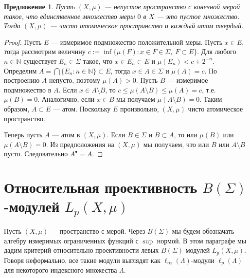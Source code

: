 \documentclass[12pt]{article}
\newtheorem{proposition}[theorem]{Предложение}
\begin{document}
\begin{proposition}\label{GenniunelyAtomicMeasCharac} Пусть $(X,\mu)$ ---
    непустое пространство с конечной мерой такое, что единственное множество
    меры $0$ в $X$ --- это пустое множество. Тогда $(X,\mu)$ --- чисто
    атомическое пространство и каждый атом твердый.
\end{proposition}
\begin{proof} Пусть $E$ --- измеримое подмножество положительной меры. Пусть
    $x\in E$, тогда рассмотрим величину $c:=\inf \{\mu(F):x\in F\in \Sigma,\;
        F\subset E\}$. Для любого $n\in\mathbb{N}$ существует $E_n\in\Sigma$ такое,
    что $x\in E_n\subset E$ и $\mu(E_n)<c+2^{-n}$. Определим $A=\bigcap
        \{E_n:n\in\mathbb{N}\}\subset E$, тогда $x\in A\in\Sigma$ и $\mu(A)=c$. По
    построению $A$ непусто, поэтому $\mu(A)>0$. Пусть $B$ --- измеримое
    подмножество в $A$. Если $x\in A\setminus B$, то $c\leq\mu(A\setminus
        B)\leq\mu(A)=c$, т.е. $\mu(B)=0$. Аналогично, если $x\in B$ мы получаем
    $\mu(A\setminus B)=0$. Таким образом, $A\subset E$ --- атом. Поскольку $E$
    произвольно, $(X,\mu)$ чисто атомическое пространство.

    Теперь пусть $A$ --- атом в $(X,\mu)$. Если $B\in\Sigma$ и $B\subset A$, то
    или $\mu(B)$ или $\mu(A\setminus B)=0$. Из предположения на $(X,\mu)$ мы
    получаем, что или $B$ или $A\setminus B$ пусто. Следовательно $A^\bullet=A$.
\end{proof}


\section{Относительная проективность
  \texorpdfstring{$B(\Sigma)$}{BSigma}-модулей
  \texorpdfstring{$L_p(X,\mu)$}{LpXmu}
 }\label{SectionRelativeProjectivityOfBSigmaModulesLpXmu}

Пусть $(X,\mu)$ --- пространство с мерой. Через $B(\Sigma)$ мы будем обозначать
алгебру измеримых ограниченных функций с $\sup$ нормой. В этом параграфе мы
дадим критерий относительно проективности левых $B(\Sigma)$-модулей
$L_p(X,\mu)$. Говоря неформально, все такие модули выглядят как
$\ell_\infty(\Lambda)$-модули $\ell_p(\Lambda)$ для некоторого индексного
множества $\Lambda$.
\end{document}
